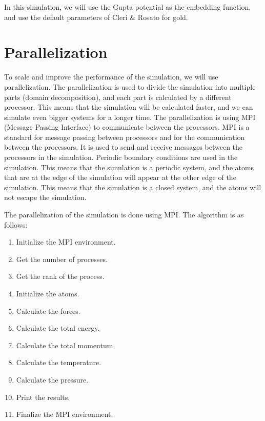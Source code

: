     In this simulation, we will use the Gupta potential \cite{gupta1981lattice} as the embedding function, and use the default parameters of Cleri \& Rosato \cite{cleri1993tight} for gold.


\section{Parallelization}
    To scale and improve the performance of the simulation, we will use parallelization. The parallelization is used to divide the simulation into multiple parts (domain decomposition), and each part is calculated by a different processor. This means that the simulation will be calculated faster, and we can simulate even bigger systems for a longer time.  
    The parallelization is using MPI (Message Passing Interface) to communicate between the processors. MPI is a standard for message passing between processors and for the communication between the processors. It is used to send and receive messages between the processors in the simulation.
    Periodic boundary conditions are used in the simulation. This means that the simulation is a periodic system, and the atoms that are at the edge of the simulation will appear at the other edge of the simulation. This means that the simulation is a closed system, and the atoms will not escape the simulation.



    The parallelization of the simulation is done using MPI. The algorithm is as follows:
    \begin{enumerate}
        \item Initialize the MPI environment.
        \item Get the number of processes.
        \item Get the rank of the process.
        \item Initialize the atoms.
        \item Calculate the forces.
        \item Calculate the total energy.
        \item Calculate the total momentum.
        \item Calculate the temperature.
        \item Calculate the pressure.
        \item Print the results.
        \item Finalize the MPI environment.
    \end{enumerate}
